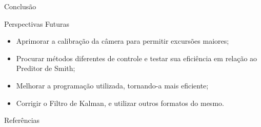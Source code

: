\documentclass[10pt]{beamer}
\begin{document}
\begin{frame}[fragile]{Conclusão}
\begin{block}{Perspectivas Futuras}
\begin{itemize}
	\item Aprimorar a calibração da câmera para permitir excursões maiores;
	\item Procurar métodos diferentes de controle e testar sua eficiência em relação ao Preditor de Smith;
	\item Melhorar a programação utilizada, tornando-a mais eficiente;
	\item Corrigir o Filtro de Kalman, e utilizar outros formatos do mesmo.
\end{itemize}
\end{block}
\end{frame}



\begin{frame}[allowframebreaks]{Referências}

  
  

\end{frame}

\end{document}
